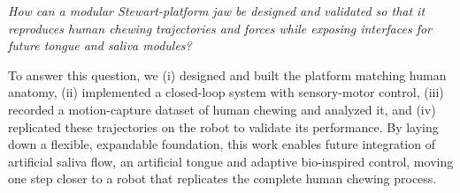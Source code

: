 \textit{How can a modular Stewart-platform jaw be designed and validated so that it reproduces human chewing trajectories and forces while exposing interfaces for 
future tongue and saliva modules?}

To answer this question, we (i) designed and built the platform matching human anatomy, (ii) implemented a closed-loop system with sensory-motor control, 
(iii) recorded a motion-capture dataset of human chewing and analyzed it, and (iv) replicated these trajectories on the robot to validate its performance. By laying down a flexible, expandable foundation, this work enables future integration of artificial saliva flow, an artificial tongue and adaptive bio-inspired control, 
moving one step closer to a robot that replicates the complete human chewing process.